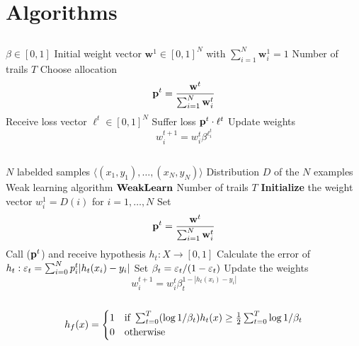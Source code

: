 
\chapter{Algorithms}
\label{app:algo}

\section{\hedge}
\label{app:hedge}

\begin{algorithm}
\caption{\hedge}
\begin{algorithmic}[1]
\Require 
\Statex $\beta\in [0,1]$
\Statex Initial weight vector $\mathbf{w}^1\in [0,1]^N$ with $\sum_{i=1}^N \mathbf{w}^1_i=1$
\Statex Number of trails $T$
\State Choose allocation $$\bf p^t= \frac{\bf w^t}{\sum_{i=1}^N \mathbf{w}^t_i}$$
\State Receive loss vector $\ell^t\in[0,1]^N$
\State Suffer loss $\bf p^t\cdot \ell^t$
\State Update weights $$w^{t+1}_i=w^t_i\beta^{\ell_{i}^{t}}$$
\EndFor
\EndProcedure
\end{algorithmic}
\end{algorithm}
\newpage
\section{\adaB}
\label{app:adaB}

\begin{algorithm}
\caption{\adaB}
\begin{algorithmic}[1]
\Require 
\Statex $N$ labelded samples $\langle (x_1,y_1),\ldots,(x_N,y_N)\rangle$
\Statex Distribution $D$ of the $N$ examples
\Statex Weak learning algorithm $\weak$
\Statex Number of trails $T$
\State \textbf{Initialize} the weight vector $w_i^1=D(i)$ for $i=1,\ldots,N$
\State Set $$\bf p^t= \frac{\bf w^t}{\sum_{i=1}^N \mathbf{w}^t_i}$$
\State Call \weak($\bf p^t$) and receive hypothesis $h_t:X\to [0,1]$
\State Calculate the error of $h_t:\ve_t=\sum^N_{i=0}p^t_i|h_t(x_i)-y_i|$
\State Set $\b_t=\ve_t/(1-\ve_t)$
\State Update the weights $$w^{t+1}_i=w^t_i\beta^{1-|h_t(x_i)-y_i|}_t$$
\EndFor\\
\Return $$h_f(x)=\begin{cases}1 & \text{if } \sum^T_{t=0}(\log1/\b_t)h_t(x)\geq\frac12\sum^T_{t=0}\log1/\b_t\\0&\text{otherwise}\end{cases}$$
\EndProcedure
\end{algorithmic}
\end{algorithm}